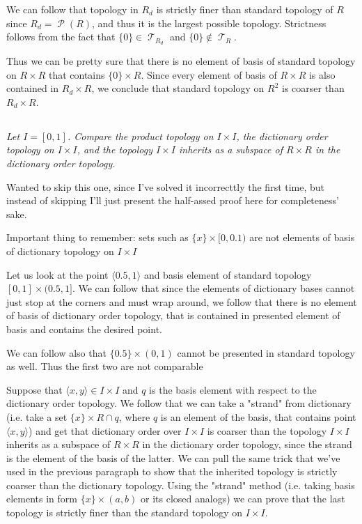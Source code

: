 \documentclass[11pt,oneside,titlepage]{book}
\DeclareMathOperator \pow {\mathcal {P}}
\DeclareMathOperator \topol {\mathcal {T}}
\newcommand{\eangle}[1]{\langle #1 \rangle}
\newcommand{\set}[1]{\{ #1 \}}
\begin{document}
We can follow that topology in  $R_d$ is strictly finer than standard topology of $R$
since $R_d = \pow(R)$, and thus it is the largest possible topology. Strictness follows
from the fact that $\set{0} \in \topol_{R_d}$ and $\set{0} \notin \topol_R$.

Thus we can be pretty sure that there is no element of basis of standard topology on $R \times R$
that contains $\set{0} \times R$. Since every element of basis of $R \times R$ is also contained
in $R_d \times R$, we conclude that standard topology on $R^2$ is coarser than $R_d \times R$.

\subsection{}

\textit{Let $I = [0, 1]$. Compare the product topology on $I \times I$, the dictionary order
  topology on $I \times I$, and the topology $I \times I$ inherits as a subspace of $R \times R$
  in the dictionary order topology.
}

Wanted to skip this one, since I've solved it incorrecttly the first time, but
instead of skipping I'll just present the half-assed proof here for completeness' sake.

Important thing to remember: sets such as $\set{x} \times [0, 0.1)$ are not elements of basis
of dictionary topology on $I \times I$ 

Let us look at the point $\eangle{0.5, 1}$ and basis element of standard topology
$[0, 1] \times (0.5, 1]$. We can follow that since the elements of dictionary bases
cannot just stop at the corners and must wrap around, we follow that there is no element of
basis of dictionary order topology, that is contained in presented element of basis
and contains the desired point.

We can follow also that $\set{0.5} \times (0, 1)$ cannot be presented in
standard topology as well. Thus the first two are not comparable

Suppose that $\eangle{x, y} \in I \times I$ and $q$ is the basis element with respect to
the dictionary order topology. We follow that we can take a "strand" from
dictionary (i.e. take a set $\set{x} \times R \cap q$, where $q$ is an element of the basis,
that contains point $\eangle{x, y}$) and get that dictionary order over $I \times I$ is coarser than
the topology $I \times I$ inherits as a subspace of $R \times R$ in the dictionary order topology,
since the strand is the element of the basis of the latter. We can pull the same trick
that we've used in the previous paragraph to show that the inherited topology is strictly coarser
than the dictionary topology. Using the "strand" method (i.e. taking basis elements
in form $\set{x} \times (a, b)$ or its closed analogs) we can prove that the last topology
is strictly finer than the standard topology on $I \times I$.
\end{document}
